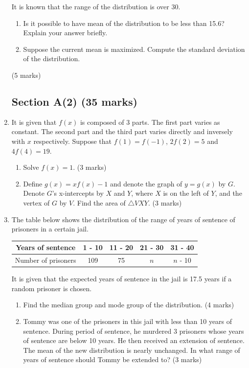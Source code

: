 \documentclass[12pt]{article}
\begin{document}
\begin{enumerate}
        It is known that the range of the distribution is over 30.
        \begin{enumerate}
            \item Is it possible to have mean of the distribution to be less than 15.6? Explain your answer briefly.
            \item Suppose the current mean is maximized. Compute the standard deviation of the distribution.
        \end{enumerate} \hfill (5 marks)

        \subsection*{Section A(2) (35 marks)}
        
        \item It is given that $f(x)$ is composed of 3 parts. The first part varies as constant. The second part and the third part varies directly and inversely with $x$ respectively. Suppose that $f(1)=f(-1)$, $2f(2)=5$ and $4f(4)=19$.\begin{enumerate}
            \item Solve $f(x)=1$. \hfill (3 marks)
            \item Define $g(x)=xf(x)-1$ and denote the graph of $y=g(x)$ by $G$. Denote $G$'s x-intercepts by $X$ and $Y$, where $X$ is on the left of $Y$, and the vertex of $G$ by $V$. Find the area of $\triangle VXY$. \hfill (3 marks)
        \end{enumerate}

        \item The table below shows the distribution of the range of years of sentence of prisoners in a certain jail.
        \begin{center}
            \begin{tabular}{||c||c|c|c|c||}
                \hline
                Years of sentence & 1 - 10 & 11 - 20 & 21 - 30 & 31 - 40\\
                \hline
                Number of prisoners & 109 & 75 & $n$ & $n$ - 10\\
                \hline
            \end{tabular}
        \end{center}
        It is given that the expected years of sentence in the jail is 17.5 years if a random prisoner is chosen.\begin{enumerate}
            \item Find the median group and mode group of the distribution. \hfill (4 marks)
            \item Tommy was one of the prisoners in this jail with less than 10 years of sentence. During period of sentence, he murdered 3 prisoners whose years of sentence are below 10 years. He then received an extension of sentence. The mean of the new distribution is nearly unchanged. In what range of years of sentence should Tommy be extended to? \hfill (3 marks)
        \end{enumerate}


\end{enumerate}
\end{document}
